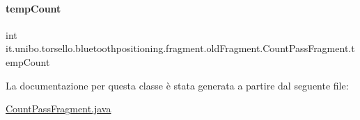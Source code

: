 \hypertarget{classit_1_1unibo_1_1torsello_1_1bluetoothpositioning_1_1fragment_1_1oldFragment_1_1CountPassFragment_a2587f4727a7290c2252e88ebfd10a56e_a2587f4727a7290c2252e88ebfd10a56e}{}\label{classit_1_1unibo_1_1torsello_1_1bluetoothpositioning_1_1fragment_1_1oldFragment_1_1CountPassFragment_a2587f4727a7290c2252e88ebfd10a56e_a2587f4727a7290c2252e88ebfd10a56e} 
\paragraph{\texorpdfstring{temp\+Count}{tempCount}}
{\footnotesize\ttfamily int it.\+unibo.\+torsello.\+bluetoothpositioning.\+fragment.\+old\+Fragment.\+Count\+Pass\+Fragment.\+temp\+Count\hspace{0.3cm}{\ttfamily [private]}}



La documentazione per questa classe è stata generata a partire dal seguente file\+:\begin{DoxyCompactItemize}
\item 
\hyperlink{CountPassFragment_8java}{Count\+Pass\+Fragment.\+java}\end{DoxyCompactItemize}
